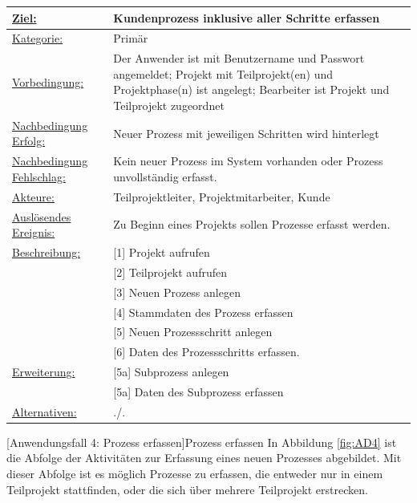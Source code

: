 \begin{tabularx}{\textwidth}{|p{}|p{}|}
        \hline
        \underline{Ziel:} & Kundenprozess inklusive aller Schritte erfassen \\\hline
        \underline{Kategorie:} & Primär\\\hline
        \underline{Vorbedingung:} & Der Anwender ist mit Benutzername und Passwort angemeldet; Projekt mit Teilprojekt(en) und Projektphase(n) ist angelegt; Bearbeiter ist Projekt und Teilprojekt zugeordnet\\\hline
        \underline{Nachbedingung Erfolg:} & Neuer Prozess mit jeweiligen Schritten wird hinterlegt \\\hline
        \underline{Nachbedingung Fehlschlag:} & Kein neuer Prozess im System vorhanden oder Prozess unvollständig erfasst. \\\hline
        \underline{Akteure:} & Teilprojektleiter, Projektmitarbeiter, Kunde\\\hline
        \underline{Auslösendes Ereignis:} & Zu Beginn eines Projekts sollen Prozesse erfasst werden.\\\hline        
        \multirow{1}{*}{\underline{Beschreibung:}} & [1] Projekt aufrufen\\
        & [2] Teilprojekt aufrufen\\
        & [3] Neuen Prozess anlegen\\
        & [4] Stammdaten des Prozess erfassen\\
        & [5] Neuen Prozessschritt anlegen\\
        & [6] Daten des Prozessschritts erfassen.\\\hline
        \multirow{1}{*}{\underline{Erweiterung:}} & [5a] Subprozess anlegen\\
        & [5a] Daten des Subprozess erfassen\\\hline
        \underline{Alternativen:} & ./. \\\hline
\end{tabularx}
[Anwendungsfall 4: Prozess erfassen]{Prozess erfassen}
\newpage
In Abbildung \ref{fig:AD4} ist die Abfolge der Aktivitäten zur Erfassung eines neuen Prozesses abgebildet. Mit dieser Abfolge ist es möglich Prozesse zu erfassen, die entweder nur in einem Teilprojekt stattfinden, oder die sich über mehrere Teilprojekt erstrecken. 
